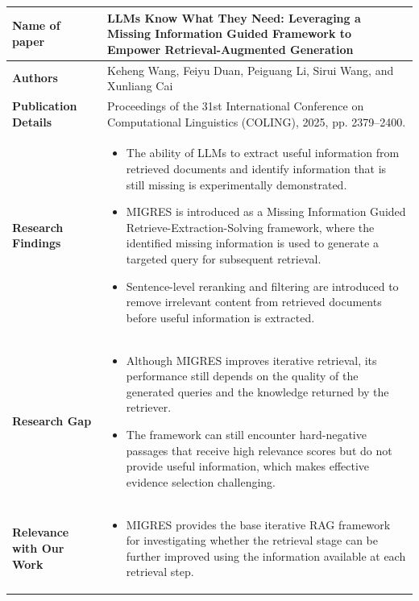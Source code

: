 \documentclass[12pt,a4paper]{report}
\begin{document}
\begin{longtable}{|p{1.25in}|p{5.15in}|}

\hline

\textbf{Name of paper} &
\textbf{LLMs Know What They Need: Leveraging a Missing Information Guided Framework to Empower Retrieval-Augmented Generation}
\\ \hline

\textbf{Authors} &
Keheng Wang, Feiyu Duan, Peiguang Li, Sirui Wang, and Xunliang Cai
\\ \hline

\textbf{Publication Details} &
Proceedings of the 31st International Conference on Computational Linguistics (COLING), 2025, pp. 2379--2400.
\\ \hline

\textbf{Research Findings} &
\begin{itemize}[
    leftmargin=0.18in,
    itemsep=0.05in,
    topsep=0pt,
    parsep=0pt
]
    \item The ability of LLMs to extract useful information from retrieved documents and identify information that is still missing is experimentally demonstrated.

    \item MIGRES is introduced as a Missing Information Guided Retrieve-Extraction-Solving framework, where the identified missing information is used to generate a targeted query for subsequent retrieval.

    \item Sentence-level reranking and filtering are introduced to remove irrelevant content from retrieved documents before useful information is extracted.
\end{itemize}
\\ \hline

\textbf{Research Gap} &
\begin{itemize}[
    leftmargin=0.18in,
    itemsep=0.05in,
    topsep=0pt,
    parsep=0pt
]
    \item Although MIGRES improves iterative retrieval, its performance still depends on the quality of the generated queries and the knowledge returned by the retriever.

    \item The framework can still encounter hard-negative passages that receive high relevance scores but do not provide useful information, which makes effective evidence selection challenging.
\end{itemize}
\\ \hline

\textbf{Relevance with Our Work} &
\begin{itemize}[
    leftmargin=0.18in,
    itemsep=0.05in,
    topsep=0pt,
    parsep=0pt
]
    \item MIGRES provides the base iterative RAG framework for investigating whether the retrieval stage can be further improved using the information available at each retrieval step.
\end{itemize}
\\ \hline

\end{longtable}
\end{document}
